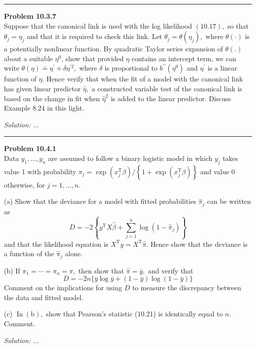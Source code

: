 \documentclass[a4paper, 11pt]{article}
\newenvironment{problem}[2][Problem]
    { \begin{mdframed}[backgroundcolor=gray!20] \textbf{#1 #2} \\}
    {  \end{mdframed}}
\newenvironment{solution}
    {\textit{Solution:}}
    {}
\begin{document}
\noindent\rule{7in}{2.8pt}
\begin{problem}{10.3.7}
Suppose that the canonical link is used with the log likelihood $(10.17),$ so that $\theta_{j}=\eta_{j}$ and that it is required to check this link. Let $\theta_{j}=\theta\left(\eta_{j}\right),$ where $\theta(\cdot)$ is a potentially nonlinear function. By quadratic Taylor series expansion of $\theta(.)$ about a suitable $\eta^{0}$, show that provided $\eta$ contains an intercept term, we can write $\theta(\eta) \doteq \eta^{\prime}+\delta \eta^{\prime 2},$ where $\delta$ is proportional to $b^{\prime \prime}\left(\eta^{0}\right)$ and $\eta^{\prime}$ is a linear function of $\eta .$ Hence verify that when the fit of a model with the canonical link has given linear predictor $\widehat{\eta},$ a constructed variable test of the canonical link is based on the change in fit when $\widehat{\eta}^{2}$ is added to the linear predictor. Discuss Example 8.24 in this light.
\end{problem}
\begin{solution}
...
\end{solution}

\noindent\rule{7in}{2.8pt}

\begin{problem}{10.4.1}
Data $y_{1}, \ldots, y_{n}$ are assumed to follow a binary logistic model in which $y_{j}$ takes value 1 with probability $\pi_{j}=\exp \left(x_{j}^{\mathrm{T}} \beta\right) /\left\{1+\exp \left(x_{j}^{\mathrm{T}} \beta\right)\right\}$ and value 0 otherwise, for $j=1, \ldots, n$.

(a) Show that the deviance for a model with fitted probabilities $\widehat{\pi}_{j}$ can be written as
\[
D=-2\left\{y^{\mathrm{T}} X \widehat{\beta}+\sum_{j=1}^{n} \log \left(1-\widehat{\pi}_{j}\right)\right\}
\]
and that the likelihood equation is $X^{\mathrm{T}} y=X^{\mathrm{T}} \widehat{\pi} .$ Hence show that the deviance is a function of the $\widehat{\pi}_{j}$ alone.

(b) If $\pi_{1}=\cdots=\pi_{n}=\pi,$ then show that $\widehat{\pi}=\bar{y},$ and verify that
\[
D=-2 n\{\bar{y} \log \bar{y}+(1-\bar{y}) \log (1-\bar{y})\}
\]
Comment on the implications for using $D$ to measure the discrepancy between the data and fitted model.

(c) $\operatorname{In}(\mathrm{b}),$ show that Pearson's statistic (10.21) is identically equal to $n .$ Comment.
\end{problem}
\begin{solution}
...
\end{solution}
\end{document}
